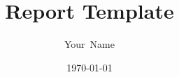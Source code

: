 \documentclass[11pt,a4paper]{article}
\title{Report Template}
\author{Your~Name}
\date{\today}
\begin{document}
\makecustomtitle








\nocite{*} %
\printbibliography
\end{document}
